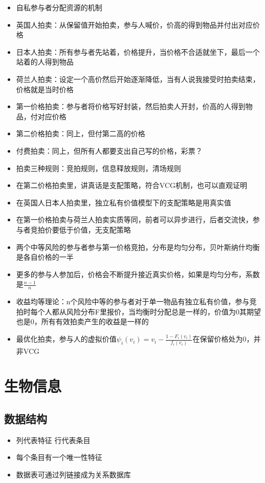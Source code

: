 \documentclass[
]{book}
\providecommand{\tightlist}{%
  \setlength{\itemsep}{0pt}\setlength{\parskip}{0pt}}
\begin{document}
\begin{itemize}
\tightlist
\item
  自私参与者分配资源的机制
\item
  英国人拍卖：从保留值开始拍卖，参与人喊价，价高的得到物品并付出对应价格
\item
  日本人拍卖：所有参与者先站着，价格提升，当价格不合适就坐下，最后一个站着的人得到物品
\item
  荷兰人拍卖：设定一个高价然后开始逐渐降低，当有人说我接受时拍卖结束，价格就是当时价格
\item
  第一价格拍卖：参与者将价格写好封装，然后拍卖人开封，价高的人得到物品，付对应价格
\item
  第二价格拍卖：同上，但付第二高的价格
\item
  付费拍卖：同上，但所有人都要支出自己写的价格，彩票？
\item
  拍卖三种规则：竞拍规则，信息释放规则，清场规则
\item
  在第二价格拍卖里，讲真话是支配策略，符合VCG机制，也可以直观证明
\item
  在英国人日本人拍卖里，独立私有价值模型下的支配策略是用真实值
\item
  在第一价格拍卖与荷兰人拍卖实质等同，前者可以异步进行，后者交流快，参与者竞拍价要低于价值，无支配策略
\item
  两个中等风险的参与者参与第一价格竞拍，分布是均匀分布，贝叶斯纳什均衡是各自价格的一半
\item
  更多的参与人参加后，价格会不断提升接近真实价格，如果是均匀分布，系数是\(\frac{n-1}{n}\)
\item
  收益均等理论：n个风险中等的参与者对于单一物品有独立私有价值，参与竞拍时每个人都从风险分布F里报价，当均衡时分配总是一样的，价值为0其期望也是0，所有有效拍卖产生的收益是一样的
\item
  最优化拍卖，参与人的虚拟价值\(\psi_i(v_i) = v_i - \frac{1-F_i(v_i)}{f_i(v_i)}\)在保留价格处为0，并非VCG
\end{itemize}

\hypertarget{bios}{%
\chapter{生物信息}\label{bios}}

\hypertarget{ux6570ux636eux7ed3ux6784}{%
\section{数据结构}\label{ux6570ux636eux7ed3ux6784}}

\begin{itemize}
\tightlist
\item
  列代表特征 行代表条目
\item
  每个条目有一个唯一性特征
\item
  数据表可通过列链接成为关系数据库
\end{itemize}
\end{document}
